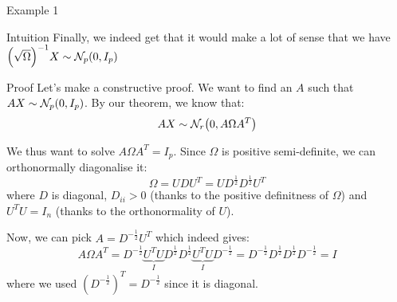 \documentclass[a4paper]{article}
\begin{document}
\begin{parag}{Example 1}
\begin{subparag}{Intuition}
        Finally, we indeed get that it would make a lot of sense that we have $\left(\sqrt{\Omega}\right)^{-1} X \followsdistr \mathcal{N}_p\left(0, I_p\right)$
    \end{subparag}
    

    \begin{subparag}{Proof}
        Let's make a constructive proof. We want to find an $A$ such that $A X \followsdistr \mathcal{N}_p\left(0, I_p\right)$. By our theorem, we know that: 
        \[AX \followsdistr  \mathcal{N}_r\left(0, A \Omega A^T\right)\]
        
        We thus want to solve $A \Omega A^T = I_p$. Since $\Omega$ is positive semi-definite, we can orthonormally diagonalise it:
        \[\Omega = U D U^T = U D^{\frac{1}{2}} D^{\frac{1}{2}} U^T\]
        where $D$ is diagonal, $D_{ii} > 0$ (thanks to the positive definitness of $\Omega$) and $U^T U = I_n$ (thanks to the orthonormality of $U$).

        Now, we can pick $A = D^{-\frac{1}{2}} U^T$ which indeed gives:
        \[A \Omega A^T = D^{-\frac{1}{2}} \underbrace{U^T U}_{I} D^{\frac{1}{2}} D^{\frac{1}{2}} \underbrace{U^T U}_{I} D^{-\frac{1}{2}} = D^{-\frac{1}{2}} D^{\frac{1}{2}} D^{\frac{1}{2}} D^{-\frac{1}{2}} = I\]
        where we used $\left(D^{-\frac{1}{2}}\right)^{T} = D^{-\frac{1}{2}}$ since it is diagonal.

    \end{subparag}
\end{parag}
\end{document}
